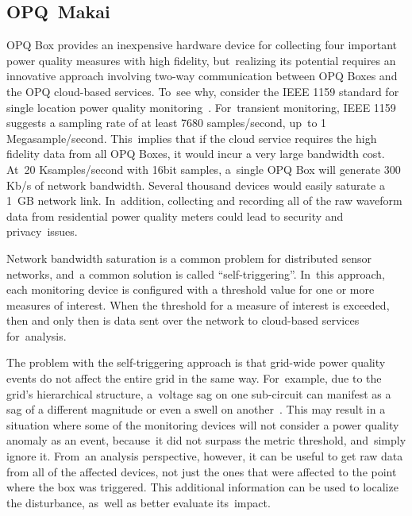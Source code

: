\documentclass[energies,article,accept,moreauthors,pdftex]{Definitions/mdpi}
\begin{document}
\subsection{OPQ~Makai}
\label{sec:opq-makai}

OPQ Box provides an inexpensive hardware device for collecting four important power quality measures with high fidelity, but~realizing its potential requires an innovative approach involving two-way communication between OPQ Boxes and the OPQ cloud-based services. To~see why, consider the IEEE 1159 standard for single location power quality monitoring~\cite{unruh_ieee_2018}. For~transient monitoring, IEEE 1159 suggests a sampling rate of at least 7680 samples/second, up~to 1 Megasample/second. This~implies that if the cloud service requires the high fidelity data from all OPQ Boxes, it would incur a very large bandwidth cost. At~20 Ksamples/second with 16bit samples, a~single OPQ Box will generate 300 Kb/s of network bandwidth. Several thousand devices would easily saturate a 1~GB network link. In~addition, collecting and recording all of the raw waveform data from residential power quality meters could lead to security and privacy~issues.

Network bandwidth saturation is a common problem for distributed sensor networks, and~a common solution is called ``self-triggering''. In~this approach, each monitoring device is configured with a threshold value for one or more measures of interest. When the threshold for a measure of interest is exceeded, then and only then is data sent over the network to cloud-based services for~analysis.

The problem with the self-triggering approach is that grid-wide power quality events do not affect the entire grid in the same way. For~example, due to the grid’s hierarchical structure, a~voltage sag on one sub-circuit can manifest as a sag of a different magnitude or even a swell on another~\cite{kahle_power_2015}. This may result in a situation where some of the monitoring devices will not consider a power quality anomaly as an event, because~it did not surpass the metric threshold, and~simply ignore it. From~an analysis perspective, however, it can be useful to get raw data from all of the affected devices, not just the ones that were affected to the point where the box was triggered. This additional information can be used to localize the disturbance, as~well as better evaluate its~impact.
\end{document}
